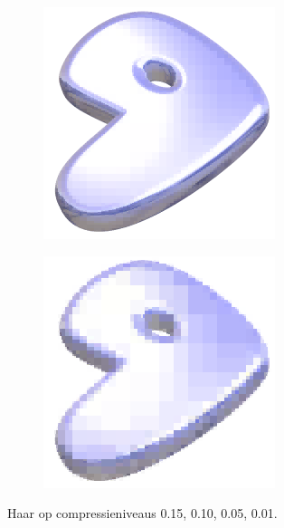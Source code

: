 \begin{figure}
\begin{subfigure}[b]{0.24\textwidth}
  \end{subfigure}
  \begin{subfigure}[b]{0.24\textwidth}
    \centering
    \includegraphics[width=\textwidth]{plaatjes/gentoo_haar_0_05.png}
  \end{subfigure}
  \begin{subfigure}[b]{0.24\textwidth}
    \centering
    \includegraphics[width=\textwidth]{plaatjes/gentoo_haar_0_01.png}
  \end{subfigure}
  \caption{Haar op compressieniveaus 0.15, 0.10, 0.05, 0.01.}
\end{figure}
